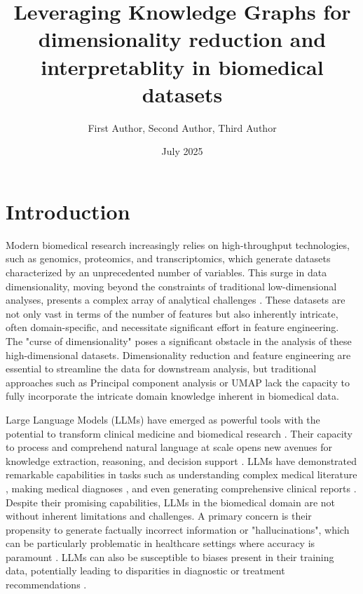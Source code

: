 \documentclass{article}
\title{Leveraging Knowledge Graphs for dimensionality reduction and interpretablity in biomedical datasets}
\author{First Author, Second Author, Third Author}
\date{July 2025}
\begin{document}
\maketitle

\section{Introduction} 
Modern biomedical research increasingly relies on high-throughput technologies, such as genomics, proteomics, and transcriptomics, which generate datasets characterized by an unprecedented number of variables. This surge in data dimensionality, moving beyond the constraints of traditional low-dimensional analyses, presents a complex array of analytical challenges . These datasets are not only vast in terms of the number of features but also inherently intricate, often domain-specific, and necessitate significant effort in feature engineering. The "curse of dimensionality" poses a significant obstacle in the analysis of these high-dimensional datasets.  Dimensionality reduction and feature engineering are essential to streamline the data for downstream analysis, but traditional approaches such as Principal component analysis \cite{bro2014principal} or UMAP \cite{mcinnes2018umap} lack the capacity to fully incorporate the intricate domain knowledge inherent in biomedical data.

Large Language Models (LLMs) have emerged as powerful tools with the potential to transform clinical medicine and biomedical research . Their capacity to process and comprehend natural language at scale opens new avenues for knowledge extraction, reasoning, and decision support . LLMs have demonstrated remarkable capabilities in tasks such as understanding complex medical literature \cite{lievin2024can}, making medical diagnoses \cite{rios2024evaluation, zakka2024almanac}, and even generating comprehensive clinical reports \cite{wang2024llm}. Despite their promising capabilities, LLMs in the biomedical domain are not without inherent limitations and challenges. A primary concern is their propensity to generate factually incorrect information or "hallucinations", which can be particularly problematic in healthcare settings where accuracy is paramount \cite{wu2024guiding}. LLMs can also be susceptible to biases present in their training data, potentially leading to disparities in diagnostic or treatment recommendations \cite{zhang2025revolutionizing}. 
\end{document}
